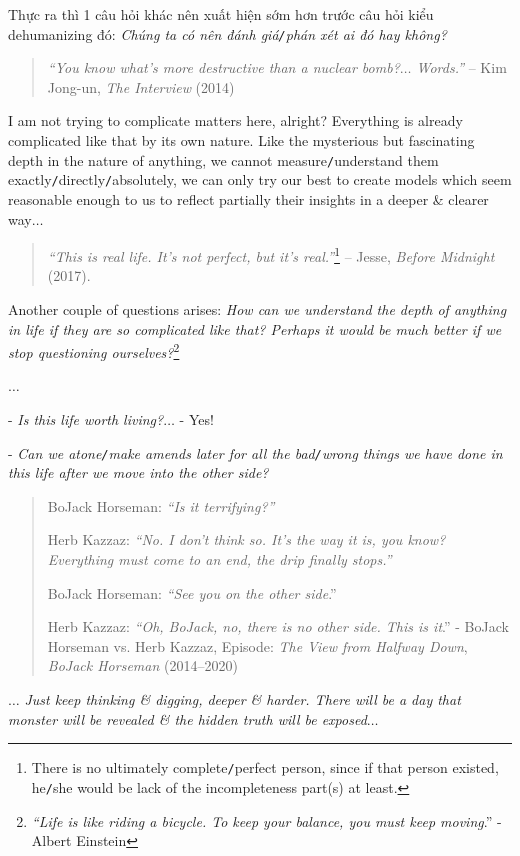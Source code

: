 \documentclass[12pt,twoside]{book}
\begin{document}
Thực ra thì 1 câu hỏi khác nên xuất hiện sớm hơn trước câu hỏi kiểu dehumanizing đó: {\it Chúng ta có nên đánh giá{\tt/}phán xét ai đó hay không?}
\begin{quotation}
	{\it``You know what's more destructive than a nuclear bomb?$\ldots$ Words.''} -- {\sf Kim Jong-un}, {\it The Interview} (2014)
\end{quotation}
I am not trying to complicate matters here, alright? Everything is already complicated like that by its own nature. Like the mysterious but fascinating depth in the nature of anything, we cannot measure{\tt/}understand them exactly{\tt/}directly{\tt/}absolutely, we can only try our best to create models which seem reasonable enough to us to reflect partially their insights in a deeper \& clearer way$\ldots$

\begin{quotation}
	{\it``This is real life. It's not perfect, but it's real.''}\footnote{There is no ultimately complete{\tt/}perfect person, since if that person existed, he{\tt/}she would be lack of the incompleteness part(s) at least.} -- {\sf Jesse}, {\it Before Midnight} (2017).
\end{quotation}
Another couple of questions arises: {\it How can we understand the depth of anything in life if they are so complicated like that? Perhaps it would be much better if we stop questioning ourselves?}\footnote{{\it``Life is like riding a bicycle. To keep your balance, you must keep moving}.'' - Albert Einstein}

$\ldots$

- {\it Is this life worth living?}$\ldots$ - Yes!

- {\it Can we atone{\tt/}make amends later for all the bad{\tt/}wrong things we have done in this life after we move into the other side?}
\begin{quote}    
	BoJack Horseman: {\it ``Is it terrifying?''}
	
	Herb Kazzaz: {\it ``No. I don't think so. It's the way it is, you know? Everything must come to an end, the drip finally stops.''}
	
	BoJack Horseman: {\it``See you on the other side}.''
	
	Herb Kazzaz: {\it``Oh, BoJack, no, there is no other side. This is it}.'' - BoJack Horseman vs. Herb Kazzaz,  Episode: {\it The View from Halfway Down}, {\it BoJack Horseman} (2014--2020)
\end{quote}
$\ldots$ {\it Just keep thinking \& digging, deeper \& harder. There will be a day that monster will be revealed \& the hidden truth will be exposed}$\ldots$
\end{document}
